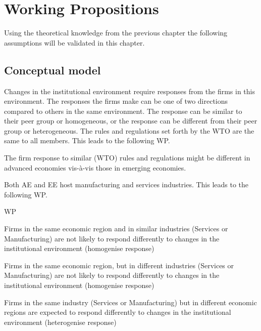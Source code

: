 \chapter{Working Propositions}
\label{ch:WP}

Using the theoretical knowledge from the previous chapter the following assumptions will be validated in this chapter.

\section{Conceptual model}
Changes in the institutional environment require responses from the firms in this environment.
The responses the firms make can be one of two directions compared to others in the same environment.
The response can be similar to their peer group or homogeneous, or the response can be different from their peer group or heterogeneous. 
The rules and regulations set forth by the WTO are the same to all members. 
This leads to the following WP.

\begin{WP}
 The firm response to similar (WTO) rules and regulations might be different in advanced economies vis-à-vis those in emerging economies.
\end{WP}

Both AE and EE host manufacturing and services industries. This leads to the following WP.
\bigskip

\begin{subtheorem}{WP} 
\begin{WP}
Firms in the same economic region and in similar industries (Services or Manufacturing) are not likely to respond differently to changes in the institutional environment (homogenise response)
\end{WP}
\begin{WP}
Firms in the same economic region, but in different industries (Services or Manufacturing) are not likely to respond differently to changes in the institutional environment (homogenise response)
\end{WP}
\begin{WP}
Firms in the same industry (Services or Manufacturing) but in different economic regions are expected to respond differently to changes in the institutional environment (heterogenise response)
\end{WP}
\end{subtheorem}

